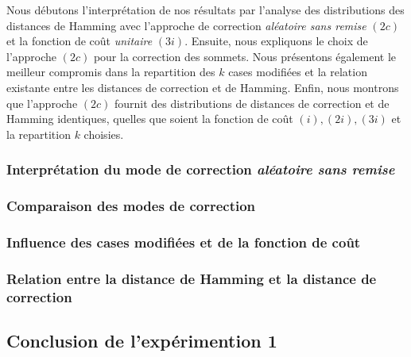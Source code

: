 \documentclass[onecolumn, 12pt]{book}
\begin{document}
	Nous d\'ebutons l'interpr\'etation de nos r\'esultats par l'analyse des distributions des distances de Hamming avec l'approche de correction {\em al\'eatoire sans remise} $(2c)$ et  la fonction de co\^ut {\em unitaire} $(3i)$.
	Ensuite, nous expliquons le choix de l'approche $(2c)$  pour la correction des sommets. 
	Nous pr\'esentons \'egalement le meilleur compromis dans la repartition des $k$ cases modifi\'ees et la relation existante entre les distances de correction et de Hamming.
	Enfin,  nous montrons que l'approche $(2c)$ fournit des distributions de distances de correction et de Hamming identiques, quelles que soient la fonction de co\^ut $(i), (2i), (3i)$ et la repartition $k$ choisies.
		\subsubsection{Interpr\'etation du mode de correction {\em al\'eatoire sans remise}}
			\label{experimentation1InterpretationModeAleatoireSansRemise}
			
		\subsubsection{Comparaison des modes de correction}
			
		\subsubsection{Influence des cases modifi\'ees et de la fonction de co\^ut}
			\label{influenceFonctionCoutDistributionHamming1}
			
		\subsubsection{Relation entre la distance de Hamming et la distance de correction}
			
%			
	\subsection{Conclusion de l'exp\'erimention 1}	
		
\end{document}
